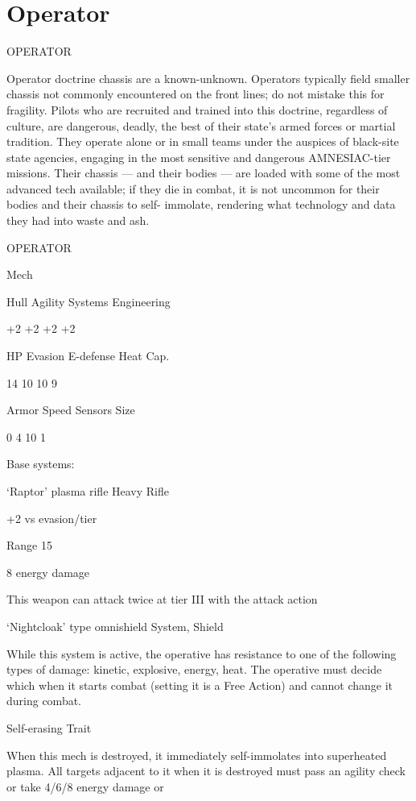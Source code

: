 \section{Operator}

                                              OPERATOR  

Operator doctrine chassis are a known-unknown. Operators typically field smaller chassis not  
commonly encountered on the front lines; do not mistake this for fragility. Pilots who are recruited  
and trained into this doctrine, regardless of culture, are dangerous, deadly, the best of their  
state’s armed forces or martial tradition. They operate alone or in small teams under the auspices  
of black-site state agencies, engaging in the most sensitive and dangerous AMNESIAC-tier  
missions. Their chassis — and their bodies — are loaded with some of the most advanced tech  
available; if they die in combat, it is not uncommon for their bodies and their chassis to self- 
immolate, rendering what technology and data they had into waste and ash. 
 

 OPERATOR 

 Mech 

 Hull       Agility      Systems       Engineering 

 +2         +2           +2            +2 

 HP         Evasion      E-defense     Heat Cap. 

 14         10           10            9 

 Armor      Speed        Sensors       Size 

 0          4            10            1 

Base systems:
 
‘Raptor’ plasma rifle  
Heavy Rifle
 
+2 vs evasion/tier
 
Range 15
 
8 energy damage
 
This weapon can attack twice at tier III with the attack action
 

‘Nightcloak’ type omnishield  
System, Shield
 
While this system is active, the operative has resistance to one of the following types of damage:  
kinetic, explosive, energy, heat. The operative must decide which when it starts combat (setting it  
is a Free Action) and cannot change it during combat.
 

Self-erasing  
Trait
 
When this mech is destroyed, it immediately self-immolates into superheated plasma. All targets  
adjacent to it when it is destroyed must pass an agility check or take 4/6/8 energy damage or  

